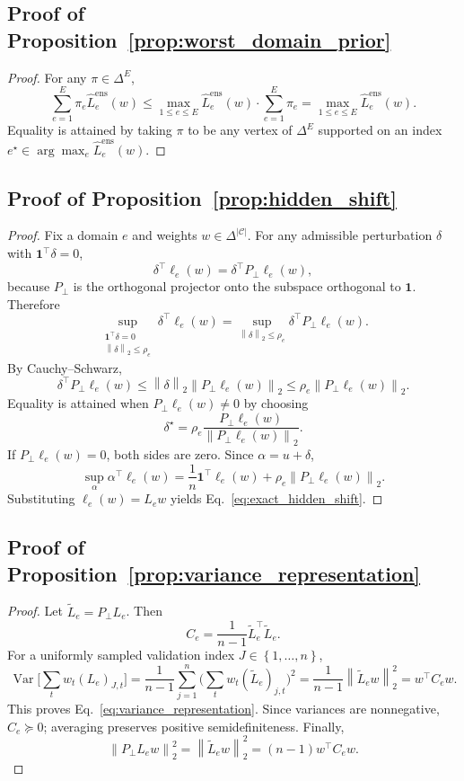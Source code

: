 \documentclass{article}
\theoremstyle{definition}
\newcommand{\cC}{\mathcal{C}}
\newcommand{\one}{\mathbf{1}}
\newcommand{\simplex}{\Delta}
\newcommand{\norm}[1]{\left\lVert #1 \right\rVert}
\newcommand{\braces}[1]{\left\{ #1 \right\}}
\begin{document}
\subsection{Proof of Proposition~\ref{prop:worst_domain_prior}}

\begin{proof}
For any \(\pi\in \simplex^{E}\),
\[
\sum_{e=1}^{E}\pi_e \widehat L_e^{\mathrm{ens}}(w)
\le
\max_{1\le e\le E}\widehat L_e^{\mathrm{ens}}(w)
\cdot \sum_{e=1}^{E}\pi_e
=
\max_{1\le e\le E}\widehat L_e^{\mathrm{ens}}(w).
\]
Equality is attained by taking \(\pi\) to be any vertex of \(\simplex^{E}\) supported on an index \(e^\star\in\arg\max_e \widehat L_e^{\mathrm{ens}}(w)\).
\end{proof}

\subsection{Proof of Proposition~\ref{prop:hidden_shift}}

\begin{proof}
Fix a domain \(e\) and weights \(w\in\simplex^{|\cC|}\). For any admissible perturbation \(\delta\) with \(\one^\top\delta=0\),
\[
\delta^\top \ell_e(w)
=
\delta^\top P_\perp \ell_e(w),
\]
because \(P_\perp\) is the orthogonal projector onto the subspace orthogonal to \(\one\). Therefore
\[
\sup_{\substack{\one^\top\delta=0\\ \norm{\delta}_2\le \rho_e}}
\delta^\top \ell_e(w)
=
\sup_{\norm{\delta}_2\le \rho_e}\delta^\top P_\perp \ell_e(w).
\]
By Cauchy--Schwarz,
\[
\delta^\top P_\perp \ell_e(w)
\le
\norm{\delta}_2 \norm{P_\perp \ell_e(w)}_2
\le
\rho_e \norm{P_\perp \ell_e(w)}_2.
\]
Equality is attained when \(P_\perp \ell_e(w)\neq 0\) by choosing
\[
\delta^\star
=
\rho_e \frac{P_\perp \ell_e(w)}{\norm{P_\perp \ell_e(w)}_2}.
\]
If \(P_\perp \ell_e(w)=0\), both sides are zero. Since \(\alpha=u+\delta\),
\[
\sup_{\alpha}\alpha^\top \ell_e(w)
=
\frac{1}{n}\one^\top \ell_e(w) + \rho_e \norm{P_\perp \ell_e(w)}_2.
\]
Substituting \(\ell_e(w)=L_e w\) yields Eq.~\eqref{eq:exact_hidden_shift}.
\end{proof}

\subsection{Proof of Proposition~\ref{prop:variance_representation}}

\begin{proof}
Let \(\widetilde L_e = P_\perp L_e\). Then
\[
C_e = \frac{1}{n-1}\widetilde L_e^\top \widetilde L_e.
\]
For a uniformly sampled validation index \(J\in\braces{1,\dots,n}\),
\[
\operatorname{Var}\Big[\sum_t w_t (L_e)_{J,t}\Big]
=
\frac{1}{n-1}\sum_{j=1}^{n}\Big(\sum_t w_t (\widetilde L_e)_{j,t}\Big)^2
=
\frac{1}{n-1}\norm{\widetilde L_e w}_2^2
=
w^\top C_e w.
\]
This proves Eq.~\eqref{eq:variance_representation}. Since variances are nonnegative, \(C_e\succeq 0\); averaging preserves positive semidefiniteness. Finally,
\[
\norm{P_\perp L_e w}_2^2
=
\norm{\widetilde L_e w}_2^2
=
(n-1)w^\top C_e w.
\]
\end{proof}
\end{document}

